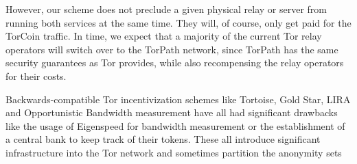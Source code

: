 However, our scheme does not preclude a given physical relay or server from running both services at the same time. They will, of course, only get paid for the TorCoin traffic. In time, we expect that a majority of the current Tor relay operators will switch over to the TorPath network, since TorPath has the same security guarantees as Tor provides, while also recompensing the relay operators for their costs.

Backwards-compatible Tor incentivization schemes like Tortoise\cite{acsac11-tortoise}, Gold Star\cite{incentives-fc10}, LIRA and Opportunistic Bandwidth measurement have all had significant drawbacks like the usage of Eigenspeed for bandwidth measurement or the establishment of a central bank to keep track of their tokens. These all introduce significant infrastructure into the Tor network and sometimes partition the anonymity sets